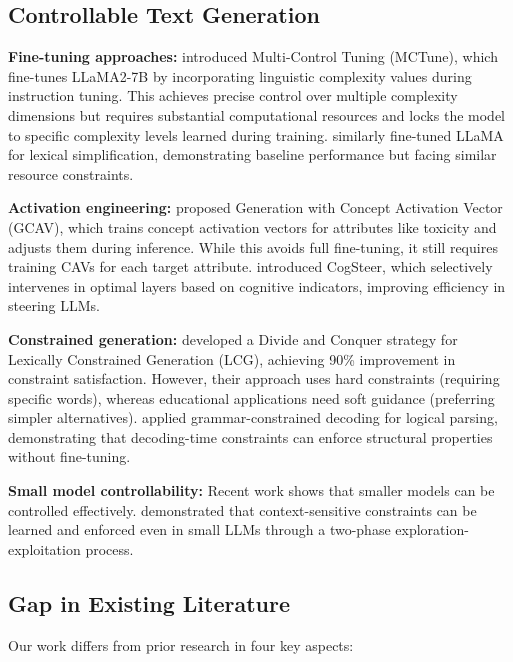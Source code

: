 \documentclass[10pt, a4paper]{article}
\begin{document}
\subsection{Controllable Text Generation}

\textbf{Fine-tuning approaches:} \citet{Nguyen2024} introduced Multi-Control Tuning (MCTune), which fine-tunes LLaMA2-7B by incorporating linguistic complexity values during instruction tuning. This achieves precise control over multiple complexity dimensions but requires substantial computational resources and locks the model to specific complexity levels learned during training. \citet{Baez2023} similarly fine-tuned LLaMA for lexical simplification, demonstrating baseline performance but facing similar resource constraints.

\textbf{Activation engineering:} \citet{Zhang2025} proposed Generation with Concept Activation Vector (GCAV), which trains concept activation vectors for attributes like toxicity and adjusts them during inference. While this avoids full fine-tuning, it still requires training CAVs for each target attribute. \citet{Wang2025} introduced CogSteer, which selectively intervenes in optimal layers based on cognitive indicators, improving efficiency in steering LLMs.

\textbf{Constrained generation:} \citet{Li2024} developed a Divide and Conquer strategy for Lexically Constrained Generation (LCG), achieving 90\% improvement in constraint satisfaction. However, their approach uses hard constraints (requiring specific words), whereas educational applications need soft guidance (preferring simpler alternatives). \citet{Raspanti2025} applied grammar-constrained decoding for logical parsing, demonstrating that decoding-time constraints can enforce structural properties without fine-tuning.

\textbf{Small model controllability:} Recent work shows that smaller models can be controlled effectively. \citet{Albinhassan2025} demonstrated that context-sensitive constraints can be learned and enforced even in small LLMs through a two-phase exploration-exploitation process.

\subsection{Gap in Existing Literature}

Our work differs from prior research in four key aspects:
\end{document}
